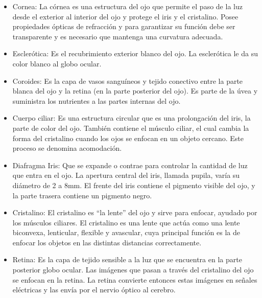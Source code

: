 \begin{itemize}
	\item Cornea: La córnea es una estructura del ojo que permite el paso de la luz
	      desde el exterior al interior del ojo y protege el iris y el cristalino. Posee
	      propiedades ópticas de refracción y para garantizar su función debe ser transparente
	      y es necesario que mantenga una curvatura adecuada.
	\item Esclerótica: Es el recubrimiento exterior blanco del ojo. La esclerótica le da
	      su color blanco al globo ocular.
	\item Coroides: Es la capa de vasos sanguíneos y tejido conectivo entre la parte blanca del ojo y la retina (en la parte posterior del ojo). Es parte de la úvea y suministra los nutrientes a las partes internas del ojo.
	\item Cuerpo ciliar: Es una estructura circular que es una prolongación del iris, la
	      parte de color del ojo. También contiene el músculo ciliar, el cual cambia la forma
	      del cristalino cuando los ojos se enfocan en un objeto cercano. Este proceso se
	      denomina acomodación.
	\item Diafragma Iris: Que se expande o contrae para controlar la cantidad de luz que
	      entra en el ojo. La apertura central del iris, llamada pupila, varía su diámetro de 2
	      a 8mm. El frente del iris contiene el pigmento visible del ojo, y la parte trasera
	      contiene un pigmento negro.
	\item Cristalino: El cristalino es “la lente” del ojo y sirve para enfocar, ayudado
	      por los músculos ciliares. El cristalino es una lente que actúa como una lente
	      biconvexa, lenticular, flexible y avascular, cuya principal función es la de enfocar
	      los objetos en las distintas distancias correctamente.
	\item Retina: Es la capa de tejido sensible a la luz que se encuentra en la parte
	      posterior globo ocular. Las imágenes que pasan a través del cristalino del ojo se
	      enfocan en la retina. La retina convierte entonces estas imágenes en señales eléctricas
	      y las envía por el nervio óptico al cerebro.
\end{itemize}
\cite{Book:Jose2005}

